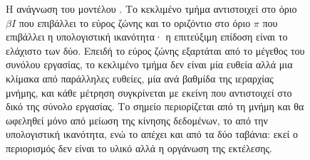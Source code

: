 \begin{figure}[H]
\begin{tikzpicture}[x=1.35cm, y=0.85cm]
    \end{tikzpicture}
    \caption{Η ανάγνωση του μοντέλου . Το κεκλιμένο τμήμα αντιστοιχεί
    στο όριο $\beta I$ που επιβάλλει το εύρος ζώνης και το οριζόντιο στο όριο $\pi$
    που επιβάλλει η υπολογιστική ικανότητα· η επιτεύξιμη επίδοση είναι το ελάχιστο
    των δύο. Επειδή το εύρος ζώνης εξαρτάται από το μέγεθος του συνόλου εργασίας,
    το κεκλιμένο τμήμα δεν είναι μία ευθεία αλλά μια κλίμακα από παράλληλες
    ευθείες, μία ανά βαθμίδα της ιεραρχίας μνήμης, και κάθε μέτρηση συγκρίνεται με
    εκείνη που αντιστοιχεί στο δικό της σύνολο εργασίας. Το σημείο 
    περιορίζεται από τη μνήμη και θα ωφεληθεί μόνο από μείωση της κίνησης
    δεδομένων, το  από την υπολογιστική ικανότητα, ενώ το  απέχει και
    από τα δύο ταβάνια: εκεί ο περιορισμός δεν είναι το υλικό αλλά η οργάνωση της
    εκτέλεσης.}
    \label{fig:meth-roofline}
\end{figure}
